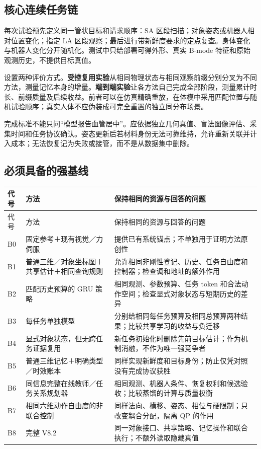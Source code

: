 \documentclass[UTF8,11pt,a4paper,fontset=fandol]{ctexart}
\numberwithin{equation}{section}
\theoremstyle{definition}
\begin{document}
\subsection{核心连续任务链}
每次试验预先定义同一管状目标和请求顺序：SA 区段扫描；对象姿态或机器人相对位置变化；指定 LA 区段观察；最后进行带新鲜度要求的定点复查。身体变化与机器人变化分开随机化。测试中只给部署可得外形、真实 B-mode 特征和原始观测历史，不提供目标真值。

设置两种评价方式。\textbf{受控复用实验}从相同物理状态与相同观察前缀分别分叉为不同方法，测量记忆本身的增量。\textbf{端到端实验}让各方法自己完成全部阶段，测量累计时长、前缀质量及后续收益。前者可以在仿真精确重放，在体模中采用匹配位置与随机试验顺序；真实人体不应伪装成可完全重置的独立同分布场景。

完成标准不能只问“模型报告血管居中”。应依据独立几何真值、盲法图像评估、采集时间和任务协议确认。姿态更新后若材料身份无法可靠维持，允许重新关联并计入成本；无法恢复记为失败或接管，而不是从数据集中删除。

\subsection{必须具备的强基线}
\begin{longtable}{P{17mm}P{45mm}P{86mm}}
\toprule
代号 & 方法 & 保持相同的资源与回答的问题\\\midrule\endfirsthead
\toprule 代号 & 方法 & 保持相同的资源与回答的问题\\\midrule\endhead
B0 & 固定参考＋现有视觉／力伺服 & 提供已有系统锚点；不单独用于证明方法原创性\\
B1 & 普通三维／对象坐标图＋共享估计＋相同查询规则 & 允许相同非刚性登记、历史、任务自由度和控制器；检查调和地址的额外作用\\
B2 & 匹配历史预算的 GRU 策略 & 相同观测、参数预算、任务 token 和合法动作空间；检查显式对象状态与短期历史的差异\\
B3 & 每任务单独模型 & 分别给相同每任务预算及相同总预算两种结果；比较共享学习的收益与负迁移\\
B4 & 显式对象状态，但无跨任务证据复用 & 新任务初始化时删除先前目标估计；作为机制消融，不作为唯一强竞争者\\
B5 & 普通三维记忆＋明确类型／时效账本 & 同样实现新鲜度和目标身份；防止仅凭对照没有完成协议获胜\\
B6 & 同信息完整在线教师／任务关系规划器 & 相同观测、机器人条件、恢复权利和候选验收；比较蒸馏的计算与质量权衡\\
B7 & 相同六维动作自由度的非联合控制 & 同样法向、横移、姿态、相位与硬限制；只改变耦合分配，隔离 QP 的作用\\
B8 & 完整 V8.2 & 同一对象接口、共享策略、记忆操作和联合执行；不额外读取隐藏真值\\\bottomrule
\end{longtable}
\end{document}

